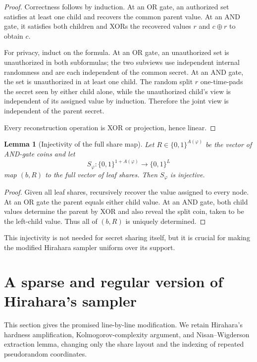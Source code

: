 \documentclass[11pt]{article}
\newtheorem{lemma}[theorem]{Lemma}
\theoremstyle{definition}
\newcommand{\bits}{\{0,1\}}
\newcommand{\xor}{\mathbin{\oplus}}
\begin{document}
\begin{proof}
Correctness follows by induction.  At an OR gate, an authorized set satisfies at least one child and recovers the common parent value.  At an AND gate, it satisfies both children and XORs the recovered values $r$ and $c\xor r$ to obtain $c$.

For privacy, induct on the formula.  At an OR gate, an unauthorized set is unauthorized in both subformulas; the two subviews use independent internal randomness and are each independent of the common secret.  At an AND gate, the set is unauthorized in at least one child.  The random split $r$ one-time-pads the secret seen by either child alone, while the unauthorized child's view is independent of its assigned value by induction.  Therefore the joint view is independent of the parent secret.

Every reconstruction operation is XOR or projection, hence linear.
\end{proof}

\begin{lemma}[Injectivity of the full share map]\label{lem:share-injective}
Let $R\in\bits^{A(\varphi)}$ be the vector of AND-gate coins and let
\[
 S_\varphi:\bits^{1+A(\varphi)}\to\bits^L
\]
map $(b,R)$ to the full vector of leaf shares.  Then $S_\varphi$ is injective.
\end{lemma}

\begin{proof}
Given all leaf shares, recursively recover the value assigned to every node.  At an OR gate the parent equals either child value.  At an AND gate, both child values determine the parent by XOR and also reveal the split coin, taken to be the left-child value.  Thus all of $(b,R)$ is uniquely determined.
\end{proof}

This injectivity is not needed for secret sharing itself, but it is crucial for making the modified Hirahara sampler uniform over its support.

\section{A sparse and regular version of Hirahara's sampler}

This section gives the promised line-by-line modification.  We retain Hirahara's hardness amplification, Kolmogorov-complexity argument, and Nisan--Wigderson extraction lemma, changing only the share layout and the indexing of repeated pseudorandom coordinates.
\end{document}
